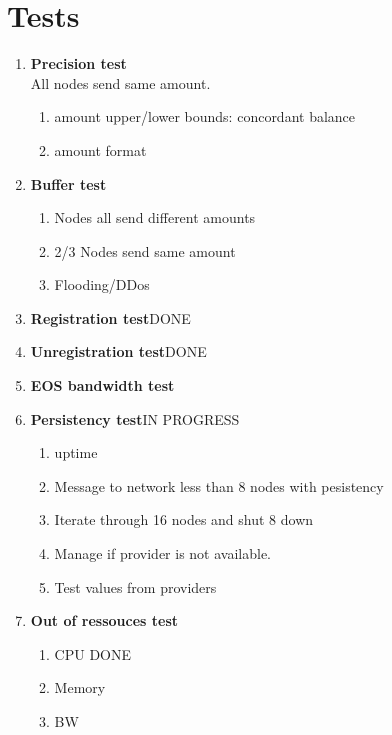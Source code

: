 \documentclass[]{article}
\begin{document}
\section{Tests}

					\begin{enumerate}
						
					\item \textbf{Precision test}\\
					All nodes send same amount.
						\begin{enumerate}
						\item amount upper/lower bounds: concordant balance
						\item amount format  
						\end{enumerate}
					\item \textbf{Buffer test}\\
					\begin{enumerate}
						\item Nodes all send different amounts 
						\item 2/3 Nodes send same amount
						\item Flooding/DDos
					\end{enumerate}
						\item \textbf{Registration test}DONE\\
						\item \textbf{Unregistration test}DONE\\
						\item \textbf{EOS bandwidth test}\\
						\item \textbf{Persistency test}IN PROGRESS\\
							\begin{enumerate}
								\item uptime\textit{}
								\item Message to network less than 8 nodes with pesistency
								\item Iterate through 16 nodes and shut 8 down
								\item Manage if provider is not available.
								\item Test values from providers
							\end{enumerate}
						\item \textbf{Out of ressouces test}\\
						\begin{enumerate}
							\item CPU DONE
							\item Memory
							\item BW
						\end{enumerate}  
				\end{enumerate}
\end{document}
